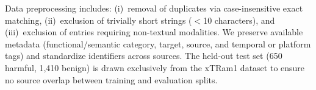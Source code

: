 \documentclass[10pt]{cai}
\begin{document}
Data preprocessing includes: (i)~removal of duplicates via case-insensitive exact matching, (ii)~exclusion of trivially short strings ($<$10 characters), and (iii)~exclusion of entries requiring non-textual modalities. We preserve available metadata (functional/semantic category, target, source, and temporal or platform tags) and standardize identifiers across sources. The held-out test set (650 harmful, 1,410 benign) is drawn exclusively from the xTRam1 dataset to ensure no source overlap between training and evaluation splits.
\end{document}
